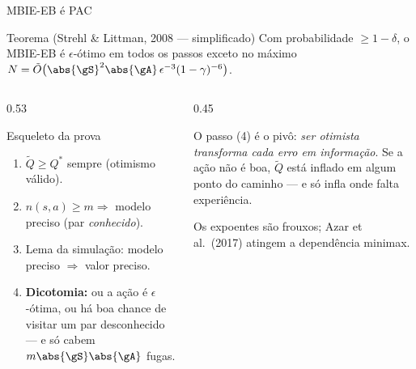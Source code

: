 \documentclass[aspectratio=169, 11pt]{beamer}
\newcommand{\Qtil}{\widetilde{Q}}
\newcommand{\Qstar}{Q^{*}}
\begin{document}
\begin{frame}{MBIE-EB é PAC}
  \begin{teobox}{Teorema (Strehl \& Littman, 2008 --- simplificado)}
    Com probabilidade $\ge 1-\delta$, o MBIE-EB é $\epsilon$-ótimo em todos os passos
    exceto no máximo
    $N = \tilde{O}\bigl(\abs{\gS}^{2}\abs{\gA}\,\epsilon^{-3}(1-\gamma)^{-6}\bigr)$.
  \end{teobox}
  \begin{columns}[T]
    \begin{column}{0.53\textwidth}
      \begin{defbox}{Esqueleto da prova}
        \begin{enumerate}
          \item $\Qtil \ge \Qstar$ sempre (otimismo válido).
          \item $n(s,a)\ge m \Rightarrow$ modelo preciso (par \emph{conhecido}).
          \item Lema da simulação: modelo preciso $\Rightarrow$ valor preciso.
          \item \textbf{Dicotomia:} ou a ação é $\epsilon$-ótima, ou há boa chance de
                visitar um par desconhecido --- e só cabem $m\abs{\gS}\abs{\gA}$ fugas.
        \end{enumerate}
      \end{defbox}
    \end{column}
    \begin{column}{0.45\textwidth}
      \begin{ideiabox}
        O passo (4) é o pivô: \emph{ser otimista transforma cada erro em informação}.
        Se a ação não é boa, $\Qtil$ está inflado em algum ponto do caminho --- e só
        infla onde falta experiência.
      \end{ideiabox}
      \begin{alertabox}
        Os expoentes são frouxos; Azar et al.\ (2017) atingem a dependência minimax.
      \end{alertabox}
    \end{column}
  \end{columns}
\end{frame}
\end{document}
